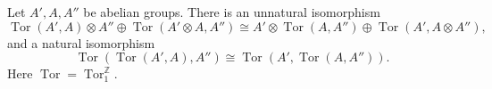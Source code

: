 Let $A', A, A''$ be abelian groups. There is an unnatural isomorphism
$$\operatorname{Tor}(A', A) \otimes A'' \oplus \operatorname{Tor}(A' \otimes A, A'') \cong A' \otimes \operatorname{Tor}(A, A'') \oplus \operatorname{Tor}(A', A \otimes A''),$$
and a natural isomorphism
$$\operatorname{Tor}(\operatorname{Tor}(A', A), A'') \cong \operatorname{Tor}(A', \operatorname{Tor}(A, A'')).$$
Here $\operatorname{Tor} = \operatorname{Tor}_1^{\mathbb{Z}}$.
